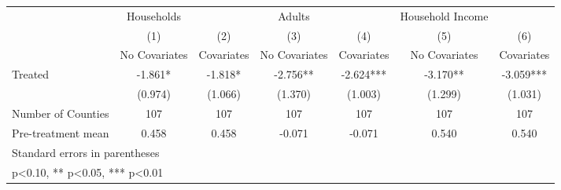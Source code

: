 {
\def\sym#1{\ifmmode^{#1}\else\(^{#1}\)\fi}
\begin{tabular}{l*{6}{c}}
\hline\hline
            &  Households   &               &      Adults   &               &Household Income   &               \\
            &\multicolumn{1}{c}{(1)}&\multicolumn{1}{c}{(2)}&\multicolumn{1}{c}{(3)}&\multicolumn{1}{c}{(4)}&\multicolumn{1}{c}{(5)}&\multicolumn{1}{c}{(6)}\\
            &\multicolumn{1}{c}{No Covariates}&\multicolumn{1}{c}{Covariates}&\multicolumn{1}{c}{No Covariates}&\multicolumn{1}{c}{Covariates}&\multicolumn{1}{c}{No Covariates}&\multicolumn{1}{c}{Covariates}\\
\hline
Treated     &      -1.861*  &      -1.818*  &      -2.756** &      -2.624***&      -3.170** &      -3.059***\\
            &     (0.974)   &     (1.066)   &     (1.370)   &     (1.003)   &     (1.299)   &     (1.031)   \\
\hline
Number of Counties&         107   &         107   &         107   &         107   &         107   &         107   \\
Pre-treatment mean&       0.458   &       0.458   &      -0.071   &      -0.071   &       0.540   &       0.540   \\
\hline\hline
\multicolumn{7}{l}{\footnotesize Standard errors in parentheses}\\
\multicolumn{7}{l}{\footnotesize * p<0.10, ** p<0.05, *** p<0.01}\\
\end{tabular}
}
